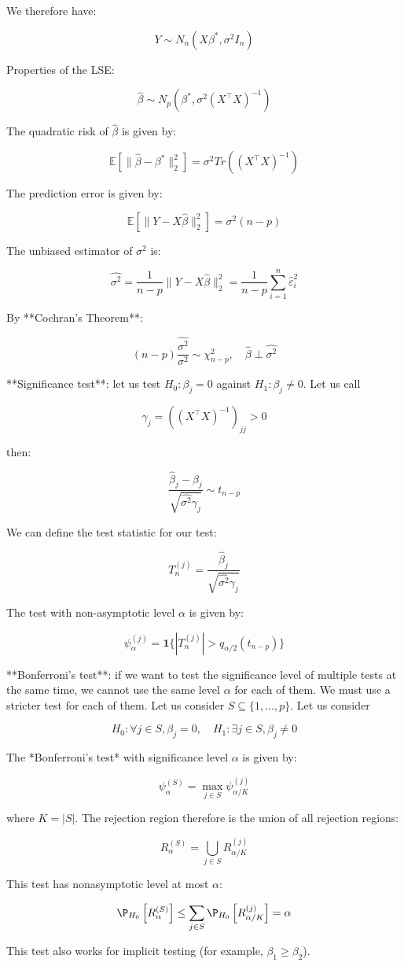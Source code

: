 We therefore have:

$$Y \sim N_n(X\beta^{*}, \sigma^2 I_n)$$

Properties of the LSE:

$$\hat{\beta} \sim N_p(\beta^{*}, \sigma^2(X^\top X)^{-1})$$

The quadratic risk of $\hat{\beta}$ is given by:

$$\mathbb{E}\left[\|\hat{\beta} - \beta^{*}\|^2_2\right] = \sigma^2 Tr \left((X^\top X)^{-1}\right)$$

The prediction error is given by:

$$\mathbb{E}\left[\|Y - X\hat{\beta}\|^2_2\right] = \sigma^2(n - p)$$

The unbiased estimator of $\sigma^2$ is:

$$\hat{\sigma^2} = \frac{1}{n-p}\|Y - X\hat{\beta}\|^2_2 = \frac1{n-p}\sum_{i=1}^n\hat{\varepsilon}_i^2$$

By **Cochran's Theorem**:

$$ (n-p)\frac{\hat{\sigma^2}}{\sigma^2} \sim \chi^2_{n-p}, \quad \hat\beta \perp \hat{\sigma^2}$$

**Significance test**: let us test $H_0: \beta_j = 0$ against $H_1: \beta_j \neq 0$. Let us call

$$\gamma_j = \left((X^\top X)^{-1}\right)_{jj} > 0$$

then:

$$\frac{\hat{\beta}_j- \beta_j}{\sqrt{\hat{\sigma^2}\gamma_j}} \sim t_{n-p}$$

We can define the test statistic for our test:

$$T_n^{(j)} = \frac{\hat{\beta}_j}{\sqrt{\hat{\sigma^2}\gamma_j}}$$

The test with non-asymptotic level $\alpha$ is given by:

$$\psi_\alpha^{(j)} = \textbf{1}\{|T_n^{(j)}| > q_{\alpha/2}(t_{n-p})\}$$

**Bonferroni's test**: if we want to test the significance level of multiple tests at the same time, we cannot use the same level $\alpha$ for each of them. We must use a stricter test for each of them. Let us consider $S \subseteq \{1, \ldots, p\}$. Let us consider

$$H_0: \forall j \in S, \beta_j = 0, \quad H_1: \exists j \in S, \beta_j \neq 0$$

The *Bonferroni's test* with significance level $\alpha$ is given by:

$$\psi_\alpha^{(S)} = \max_{j \in S}\psi_{\alpha/K}^{(j)}$$

where $K = |S|$. The rejection region therefore is the union of all rejection regions:

$$R_\alpha^{(S)} = \bigcup_{j \in S}R_{\alpha/K}^{(j)}$$

This test has nonasymptotic level at most $\alpha$:

$$\P_{H_0}\left[R_\alpha^{(S)}\right] \leq \sum_{j\in S}\P_{H_0}\left[R_{\alpha/K}^{(j)}\right] = \alpha$$

This test also works for implicit testing (for example, $\beta_1 \geq \beta_2$).
